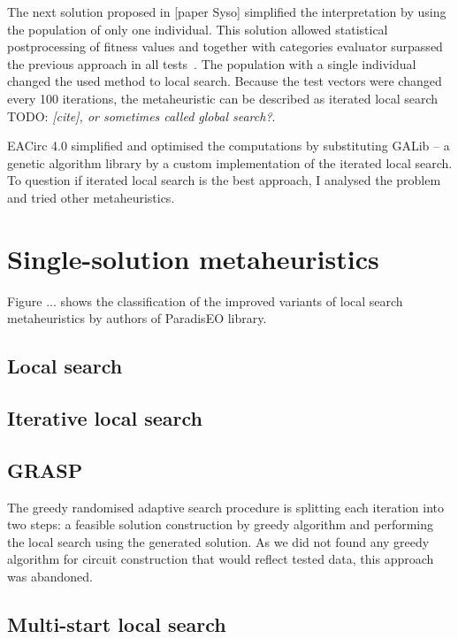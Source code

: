 \documentclass[
  print, %
  Table,   %
  nolof,     %
  nolot,     %
  11pt, %
  oneside  %
]{fithesis3}
\newcommand{\todo}[1]{TODO: \textit{#1}}
\begin{document}
The next solution proposed in [paper Syso] simplified the interpretation by using the population of only one individual. This solution allowed statistical postprocessing of fitness values and together with categories evaluator surpassed the previous approach in all tests~\cite{sys2014constructing}. The population with a single individual changed the used method to local search. Because the test vectors were changed every 100 iterations, the metaheuristic can be described as iterated local search \todo{[cite], or sometimes called global search?}.

EACirc 4.0 simplified and optimised the computations by substituting GALib -- a genetic algorithm library by a custom implementation of the iterated local search.  To question if iterated local search is the best approach, I analysed the problem and tried other metaheuristics.

\section{Single-solution metaheuristics}
\label{sec:opt-single-sol}

Figure ... shows the classification of the improved variants of local search metaheuristics by authors of ParadisEO library.

\subsection{Local search}
\label{subsec:opt-single-sol-ls}
\subsection{Iterative local search}
\label{subsec:opt-single-sol-ils}
\subsection{GRASP}
\label{subsec:opt-single-sol-grasp}

The greedy randomised adaptive search procedure is splitting each iteration into two steps: a feasible solution construction by greedy algorithm and performing the local search using the generated solution. As we did not found any greedy algorithm for circuit construction that would reflect tested data, this approach was abandoned.

\subsection{Multi-start local search}
\label{subsec:opt-single-sol-msls}
\end{document}
